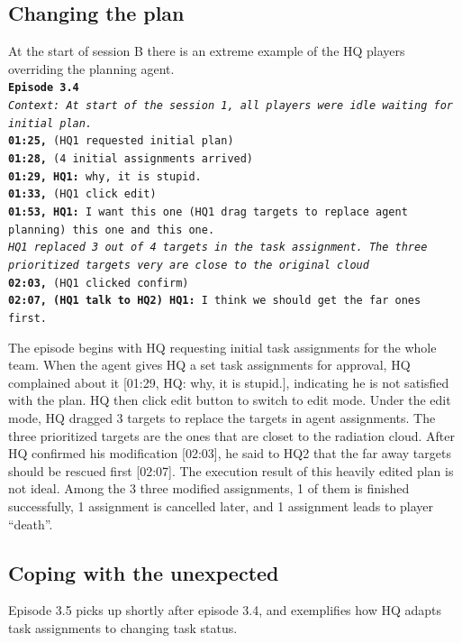 \subsection{Changing the plan}
At the start of session B there is an extreme example of the HQ players overriding the planning agent. \\

\noindent\texttt{\textbf{Episode 3.4}\\
\emph{Context: At start of the session 1, all players were idle waiting for initial plan.}\\
\textbf{01:25,} (HQ1 requested initial plan)\\
\textbf{01:28,} (4 initial assignments arrived)  \\
\textbf{01:29, HQ1:}  why, it is stupid. \\
\textbf{01:33,} (HQ1 click edit)\\
\textbf{01:53, HQ1:} I want this one (HQ1 drag targets to replace agent planning) this one and this one.\\
\emph{HQ1 replaced 3 out of 4 targets in the task assignment. The three prioritized targets very are close to the original cloud}\\
\textbf{02:03,} (HQ1 clicked confirm) \\
\textbf{02:07, (HQ1 talk to HQ2) HQ1:} I think we should get the far ones first. \\
}

The episode begins with HQ requesting initial task assignments for the whole team. When the agent gives HQ  a set task assignments for approval, HQ complained about it [01:29, HQ: why, it is stupid.], indicating he is not satisfied with the plan. HQ then click edit button to switch to edit mode. Under the edit mode, HQ dragged 3 targets to replace the targets in agent assignments. The three prioritized targets are the ones that are closet to the radiation cloud. After HQ confirmed his modification [02:03], he said to HQ2 that the far away targets should be rescued first [02:07]. The execution result of this heavily edited plan is not ideal. Among the 3 three modified assignments, 1 of them is finished successfully, 1 assignment is cancelled later, and 1 assignment leads to player ``death''.\\

\subsection{Coping with the unexpected}
Episode 3.5 picks up shortly after episode 3.4, and exemplifies how HQ adapts task assignments to changing task status. \\

